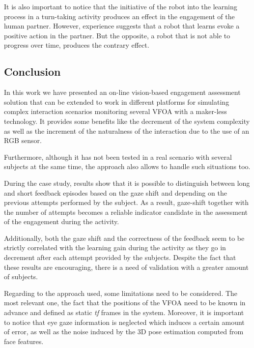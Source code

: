 \documentclass{sig-alternate}
\begin{document}
It is also important to notice that the initiative of the robot into the
learning process in a turn-taking activity produces an effect in the engagement
of the human partner. However, experience suggests that a robot that learns
evoke a positive action in the partner. But the opposite, a robot that is not
able to progress over time, produces the contrary effect.


\subsection{Conclusion}

In this work we have presented an on-line vision-based engagement assessment
solution that can be extended to work in different platforms for simulating
complex interaction scenarios monitoring several VFOA with a maker-less
technology. It provides some benefits like the decrement of the system
complexity as well as the increment of the naturalness of the interaction due to
the use of an RGB sensor.  

Furthermore, although it has not been tested in a real scenario with several
subjects at the same time, the approach also allows to handle such situations
too.

During the case study, results show that it is possible to distinguish between
long and short feedback episodes based on the gaze shift and depending on the
previous attempts performed by the subject. As a result, gaze-shift together
with the number of attempts becomes a reliable indicator candidate in the
assessment of the engagement during the activity.

Additionally, both the gaze shift and the correctness of the feedback seem to be
strictly correlated with the learning gain during the activity as they go in
decrement after each attempt provided by the subjects. Despite the fact that
these results are encouraging, there is a need of validation with a greater
amount of subjects.

Regarding to the approach used, some limitations need to be considered. The most
relevant one, the fact that the positions of the VFOA need to be known in
advance and defined as static \textit{tf} frames in the system. Moreover, it is
important to notice that eye gaze information is neglected which induces a
certain amount of error, as well as the noise induced by the 3D pose estimation
computed from face features.
\end{document}
